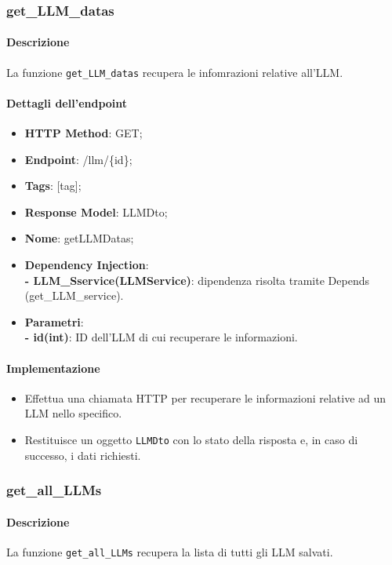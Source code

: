 \subsubsection{get\_LLM\_datas}
\label{sec:get_LLM_datas}

\paragraph{Descrizione}
La funzione \texttt{get\_LLM\_datas} recupera le infomrazioni relative all'LLM.

\paragraph{Dettagli dell'endpoint}
\begin{itemize}
    \item \textbf{HTTP Method}: GET;
    \item \textbf{Endpoint}: /llm/\{id\};
    \item \textbf{Tags}: [tag];
    \item \textbf{Response Model}: LLMDto;
    \item \textbf{Nome}: getLLMDatas;
    \item \textbf{Dependency Injection}:\\ \textbf{- LLM\_Sservice(LLMService)}: dipendenza risolta tramite Depends (get\_LLM\_service).
    \item \textbf{Parametri}:\\ \textbf{- id(int)}: ID dell'LLM di cui recuperare le informazioni.
\end{itemize}

\paragraph{Implementazione}
\begin{itemize}
    \item Effettua una chiamata HTTP per recuperare le informazioni relative ad un LLM nello specifico.
    \item Restituisce un oggetto \texttt{LLMDto} con lo stato della risposta e, in caso di successo, i dati richiesti.
\end{itemize}


\subsubsection{get\_all\_LLMs}
\label{sec:get_all_LLMs}

\paragraph{Descrizione}
La funzione \texttt{get\_all\_LLMs} recupera la lista di tutti gli LLM salvati.

